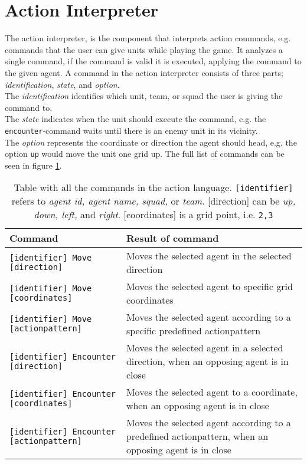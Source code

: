 \section{Action Interpreter}
The action interpreter, is the component that interprets action commands, e.g. commands that the user can give units while playing the game. 
It analyzes a single command, if the command is valid it is executed, applying the command to the given agent.
A command in the action interpreter consists of three parts; \textit{identification}, \textit{state}, and \textit{option}.\\
The \textit{identification} identifies which unit, team, or squad the user is giving the command to.\\
The \textit{state} indicates when the unit should execute the command, e.g. the \texttt{encounter}-command waits until there is an enemy unit in its vicinity.\\
The \textit{option} represents the coordinate or direction the agent should head, e.g. the option \texttt{up} would move the unit one grid up. The full list of commands can be seen in figure \ref{ac_commands}.\\

\begin{center}
	\begin{table}[H]
    \begin{tabular}{| l | p{5cm} |}
    \hline
    Command & Result of command\\ \hline
    \texttt{[identifier] Move [direction]} & Moves the selected agent in the selected direction\\ \hline
    \texttt{[identifier] Move [coordinates]} & Moves the selected agent to specific grid coordinates\\ \hline
		\texttt{[identifier] Move [actionpattern]} & Moves the selected agent according to a specific predefined actionpattern\\ \hline
		\texttt{[identifier] Encounter [direction]} & Moves the selected agent in a selected direction, when an opposing agent is in close\\ \hline
		\texttt{[identifier] Encounter [coordinates]} & Moves the selected agent to a coordinate, when an opposing agent is in close\\ \hline
		\texttt{[identifier] Encounter [actionpattern]} & Moves the selected agent according to a predefined actionpattern, when an opposing agent is in close\\ \hline
    \end{tabular}
		\caption{Table with all the commands in the action language. \texttt{[identifier]} refers to \textit{agent id, agent name, squad,} or \textit{team}. [direction] can be \textit{up, down, left,} and \textit{right}. [coordinates] is a grid point, i.e. \texttt{2,3}}
		\label{ac_commands}
	\end{table}
\end{center}

